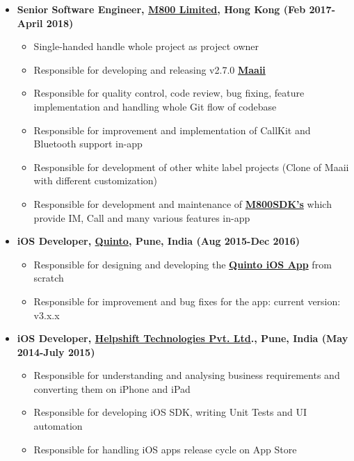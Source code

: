\documentclass[letterpaper,11pt]{article}
\newcommand{\resitem}[1]{\item #1 \vspace{-2pt}}
\begin{document}
\begin{itemize}

\resitem {{\bfseries Senior Software Engineer, \href{http://www.m800.com} {M800 Limited}, Hong Kong (Feb 2017-April 2018)}}
		{ \footnotesize
		\begin{itemize}
			\resitem{Single-handed handle whole project as project owner}
			\resitem{Responsible for developing and releasing v2.7.0  \href{https://itunes.apple.com/hk/app/id488051175}{\bfseries Maaii}}
			\resitem{Responsible for quality control, code review, bug fixing, feature implementation and handling whole Git flow of codebase}
			\resitem{Responsible for improvement and implementation of CallKit and Bluetooth support in-app}
			\resitem{Responsible for development of other white label projects (Clone of Maaii with different customization)}
			\resitem{Responsible for development and maintenance of \href{https://developer.m800.com/}{\bfseries M800SDK's}  which provide IM, Call and many various features in-app}
		\end{itemize}
		}
\resitem {{\bfseries iOS Developer, \href{http://quintoapp.com} {Quinto}, Pune, India (Aug 2015-Dec 2016)}}
		{ \footnotesize
		\begin{itemize}
			\resitem{Responsible for designing and developing the \href{https://itunes.apple.com/in/app/id912305961}{\bfseries Quinto iOS App} from scratch}
			\resitem{Responsible for improvement and bug fixes for the app: current version: v3.x.x}
		\end{itemize}
		}
\resitem {{\bfseries iOS Developer, \href{https://helpshift.com}{\bfseries Helpshift Technologies Pvt. Ltd}., Pune, India (May 2014-July 2015)}}
		{ \footnotesize
		\begin{itemize}
			\resitem{Responsible for understanding and analysing business requirements and converting them on iPhone and iPad}
			\resitem{Responsible for developing iOS SDK, writing Unit Tests and UI automation}
			\resitem{Responsible for handling iOS apps release cycle on App Store}
		\end{itemize}
		}
\end{itemize}  %
\end{document}

